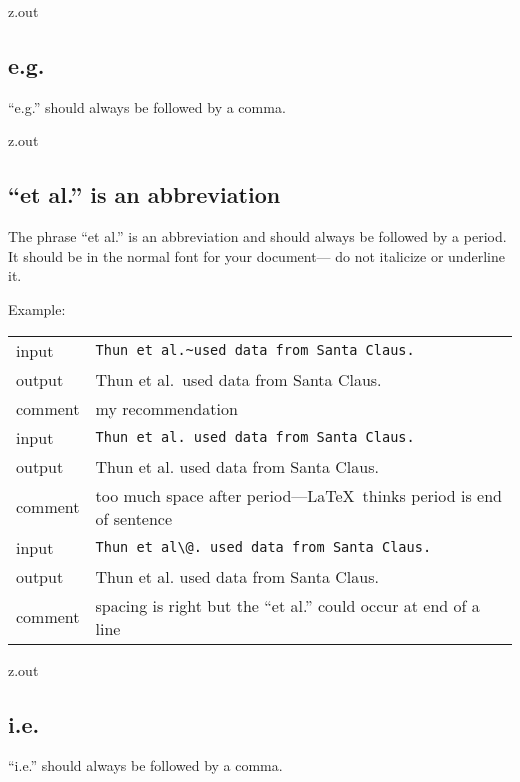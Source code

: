 \MyIO


\begin{VerbatimOut}{z.out}

\subsection{e.g.}

``e.g.'' should always be followed by a comma.
\end{VerbatimOut}

\MyIOT


\begin{VerbatimOut}{z.out}

\subsection{``et al.'' is an abbreviation}

The phrase ``et al.''
is an abbreviation
and should always be followed by a period.
It should be in the normal font for your document---%
do not italicize or underline it.

Example:\\[6pt]
\indent\indent
\begin{tabular}{@{}ll@{}}
  input&   \verb+Thun et al.~used data from Santa Claus.+\\
  output&  Thun et al.~used data from Santa Claus.\\
  comment& my recommendation\\[6pt]
  input&   \verb+Thun et al. used data from Santa Claus.+\\
  output&  Thun et al. used data from Santa Claus.\\
  comment& too much space after period---\LaTeX\ thinks period is end of sentence\\[6pt]
  input&   \verb+Thun et al\@. used data from Santa Claus.+\\
  output&  Thun et al\@. used data from Santa Claus.\\
  comment& spacing is right but the ``et al.'' could occur at end of a line\\
\end{tabular}
\end{VerbatimOut}

\MyIOT


\begin{VerbatimOut}{z.out}

\subsection{i.e.}

``i.e.'' should always be followed by a comma.
\end{VerbatimOut}

\MyIO
